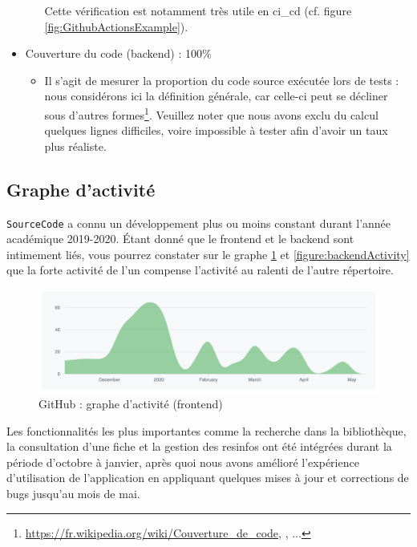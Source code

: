 \begin{itemize}[nosep,noitemsep,topsep=0pt,partopsep=0pt,after=\vspace*{2pt}]
\begin{itemize}
        Cette vérification est notamment très utile en \gls{ci_cd} (cf. figure \ref{fig:GithubActionsExample}).
    \end{itemize}
    \item Couverture du code (\gls{backend}) :  100\%
    \begin{itemize}
        \item Il s'agit de mesurer la proportion du code source exécutée lors de tests : nous considérons ici la définition générale, car celle-ci peut se décliner sous d'autres formes\footnote{
            \href{https://fr.wikipedia.org/wiki/Couverture\_de\_code}{https://fr.wikipedia.org/wiki/Couverture\_de\_code}, \cite{concept_cfg}, ...
        }.
        Veuillez noter que nous avons exclu du calcul quelques lignes difficiles, voire impossible à tester afin d'avoir un taux plus réaliste.
    \end{itemize}    
\end{itemize}

\subsection{Graphe d'activité}

\texttt{SourceCode} a connu un développement plus ou moins constant durant l'année académique 2019-2020. Étant donné que le \gls{frontend} et le \gls{backend} sont intimement liés, vous pourrez constater sur le graphe \ref{figure:frontendActivity} et \ref{figure:backendActivity} que la forte activité de l'un compense l'activité au ralenti de l'autre répertoire.

\begin{figure}[H]
    \includegraphics[width=\textwidth,height=0.3\textheight,keepaspectratio]{images/analyseCritique/graph_frontend.png}
    \centering
    \caption{GitHub : graphe d'activité (frontend)}
    \label{figure:frontendActivity}
\end{figure}

Les fonctionnalités les plus importantes comme la recherche dans la bibliothèque, la consultation d'une \gls{fiche} et la gestion des \glspl{resinfo} ont été intégrées durant la période d'octobre à janvier, après quoi nous avons amélioré l'expérience d'utilisation de l'application en appliquant quelques mises à jour et corrections de bugs jusqu'au mois de mai.\\

